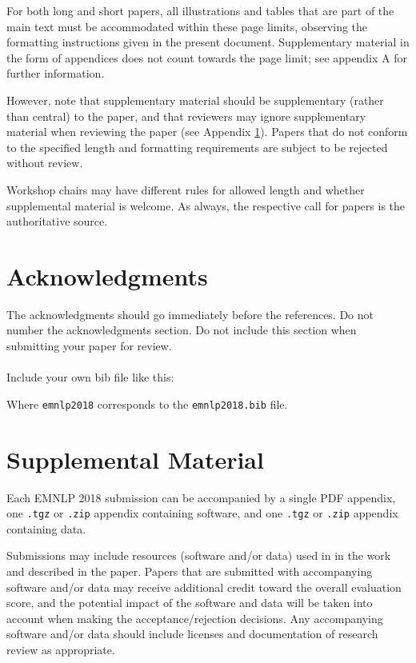 \documentclass[11pt,a4paper]{article}
\newcommand\confname{EMNLP 2018}
\begin{document}
For both long and short papers, all illustrations and tables that are part
of the main text must be accommodated within these page limits, observing
the formatting instructions given in the present document. Supplementary
material in the form of appendices does not count towards the page limit; see appendix A for further information.

However, note that supplementary material should be supplementary
(rather than central) to the paper, and that reviewers may ignore
supplementary material when reviewing the paper (see Appendix
\ref{sec:supplemental}). Papers that do not conform to the specified
length and formatting requirements are subject to be rejected without
review.

Workshop chairs may have different rules for allowed length and
whether supplemental material is welcome. As always, the respective
call for papers is the authoritative source.

\section*{Acknowledgments}

The acknowledgments should go immediately before the references.  Do
not number the acknowledgments section. Do not include this section
when submitting your paper for review. \\

 \\

Include your own bib file like this:
{\small\verb||
\verb||}

Where \verb|emnlp2018| corresponds to the {\tt emnlp2018.bib} file.



\appendix

\section{Supplemental Material}
\label{sec:supplemental}
Each \confname{} submission can be accompanied by a single PDF
appendix, one {\small\tt.tgz} or {\small\tt.zip} appendix containing
software, and one {\small\tt.tgz} or {\small\tt.zip} appendix
containing data.

Submissions may include resources (software and/or data) used in in
the work and described in the paper. Papers that are submitted with
accompanying software and/or data may receive additional credit toward
the overall evaluation score, and the potential impact of the software
and data will be taken into account when making the
acceptance/rejection decisions. Any accompanying software and/or data
should include licenses and documentation of research review as
appropriate.
\end{document}
